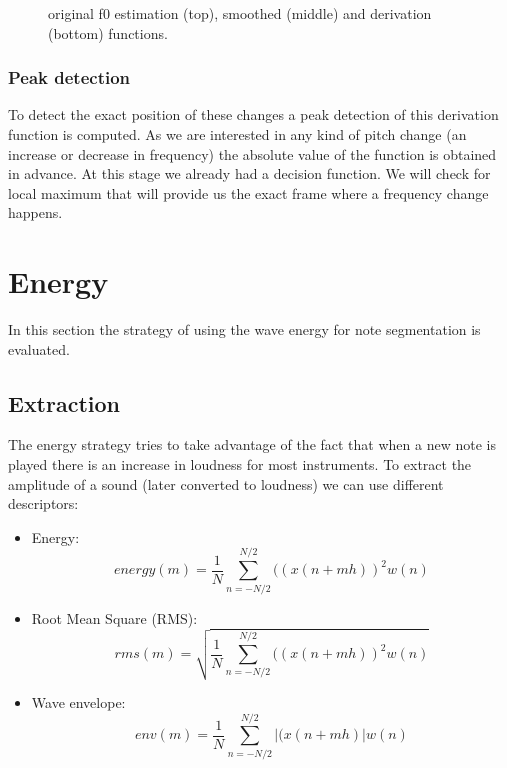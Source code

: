 \documentclass{article}
\begin{document}
\begin{figure}
 \centerline{}
 \caption{original f0 estimation (top), smoothed (middle) and derivation (bottom) functions.}
 \label{fig:f0smooth}
\end{figure}

\subsubsection{Peak detection}
To detect the exact position of these changes a peak detection of this derivation function is computed. As we are interested in any kind of pitch change (an increase or decrease in frequency) the absolute value of the function is obtained in advance. At this stage we already had a decision function.
We will check for local maximum that will provide us the exact frame where a frequency change happens.

\section{Energy}
In this section the strategy of using the wave energy for note segmentation is evaluated.

\subsection{Extraction}
The energy strategy tries to take advantage of the fact that when a new note is played there is an increase
in loudness for most instruments. To extract the amplitude of a sound (later converted to loudness) we can use different descriptors:

\begin{itemize}
	\item Energy:
		\begin{equation}
		energy(m) = \frac{1}{N}\sum_{n=-N/2}^{N/2}((x(n+mh))^2w(n)
		\end{equation}	
	\item Root Mean Square (RMS):
		\begin{equation}
		rms(m) = \sqrt{ \frac{1}{N}\sum_{n=-N/2}^{N/2}((x(n+mh))^2 w(n) }
		\end{equation}
	\item Wave envelope:		
		\begin{equation}
		env(m) = \frac{1}{N}\sum_{n=-N/2}^{N/2}|(x(n+mh)|w(n)
		\end{equation}		
\end{itemize}
\end{document}
